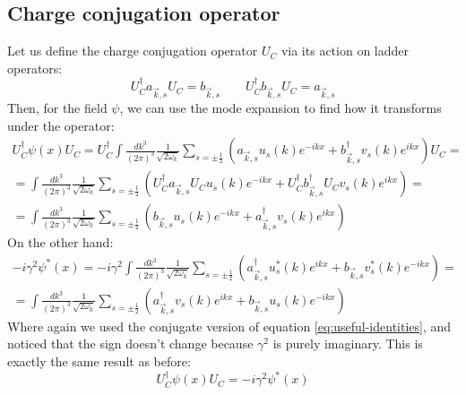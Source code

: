 \documentclass{article}
\begin{document}
\subsection{Charge conjugation operator}
Let us define the charge conjugation operator $U_C$ via its action on ladder operators:
\begin{equation}
    U_C^\dagger a_{\vec{k},s}U_C = b_{\vec{k},s}
    \qquad
    U_C^\dagger b_{\vec{k},s}U_C = a_{\vec{k},s}
\end{equation}
Then, for the field $\psi$, we can use the mode expansion to find how it transforms under the operator:
\begin{equation}
\begin{gathered}
    U_C^\dagger \psi(x)U_C = U_C^\dagger \int \frac{dk^3}{(2\pi)^3}\frac{1}{\sqrt{2\omega_k}}\sum_{s=\pm\frac{1}{2}} \left(
        a_{\vec{k}, s}u_s(k)e^{-ikx} + b_{\vec{k}, s}^\dagger v_s(k)e^{ikx}
    \right) U_C = \\ =\int \frac{dk^3}{(2\pi)^3}\frac{1}{\sqrt{2\omega_k}}\sum_{s=\pm\frac{1}{2}} \left(
         U_C^\dagger a_{\vec{k}, s} U_Cu_s(k)e^{-ikx} + U_C^\dagger b_{\vec{k}, s}^\dagger U_C v_s(k)e^{ikx}
    \right) = \\ =\int \frac{dk^3}{(2\pi)^3}\frac{1}{\sqrt{2\omega_k}}\sum_{s=\pm\frac{1}{2}} \left(
         b_{\vec{k}, s} u_s(k)e^{-ikx} + a_{\vec{k}, s}^\dagger v_s(k)e^{ikx}
    \right)
\end{gathered}
\end{equation}
On the other hand:
\begin{equation}
\begin{gathered}
    -i\gamma^2\psi^*(x) = -i\gamma^2 \int \frac{dk^3}{(2\pi)^3}\frac{1}{\sqrt{2\omega_k}}\sum_{s=\pm\frac{1}{2}} \left(
        a_{\vec{k}, s}^\dagger u_s^*(k)e^{ikx} + b_{\vec{k}, s} v_s^*(k)e^{-ikx}
    \right) = \\ = \int \frac{dk^3}{(2\pi)^3}\frac{1}{\sqrt{2\omega_k}}\sum_{s=\pm\frac{1}{2}} \left(
        a_{\vec{k}, s}^\dagger v_s(k)e^{ikx} + b_{\vec{k}, s} u_s(k)e^{-ikx}
    \right)
\end{gathered}
\end{equation}
Where again we used the conjugate version of equation \ref{eq:useful-identities}, and noticed that the sign doesn't change because $\gamma^2$ is purely imaginary. This is exactly the same result as before:
\begin{equation}
\label{eq:c-for-psi}
    U_C^\dagger \psi(x)U_C = -i\gamma^2\psi^*(x)
\end{equation}
\end{document}
